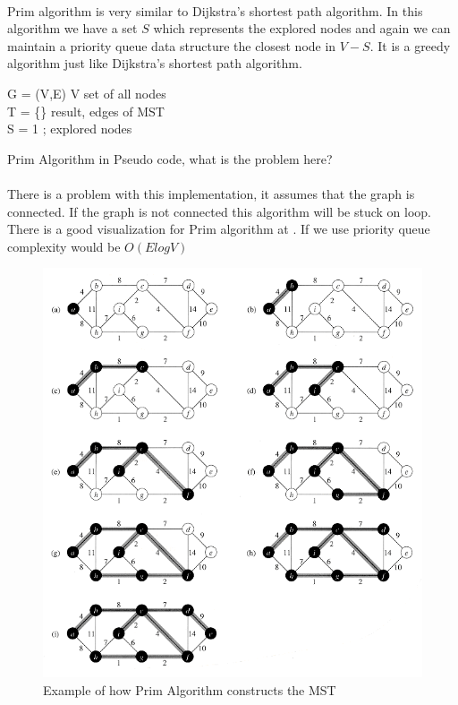 \documentclass[12pt]{article}
\begin{document}
\paragraph{}
Prim algorithm is very similar to Dijkstra's shortest path algorithm. In this algorithm we have a set $S$ which represents the explored nodes and again we can maintain a priority queue data structure the closest node in $V-S$. It is a greedy algorithm just like Dijkstra's shortest path algorithm. 

\begin{algorithm}[H]
\SetAlgoLined
  G = (V,E)   V  set of  all nodes \\
  T =  \{\}   result, edges of MST  \\
  S = { 1 };  explored nodes \\
 \caption{Prim Algorithm in Pseudo code, what is the problem here? }
\end{algorithm}

\paragraph{} There is a problem with this implementation, it assumes that the graph is connected. If the graph is not connected this algorithm will be stuck on loop. There is a good visualization for Prim algorithm at \cite{10}. If we use priority queue complexity would be $O(ElogV)$ 

\begin{figure}[h!]
\begin{center}
\includegraphics[width=\linewidth/2]{prim.png}
  \end{center}
\caption{ Example of how Prim Algorithm constructs the MST }
  \label{fig}
\end{figure}
\end{document}
